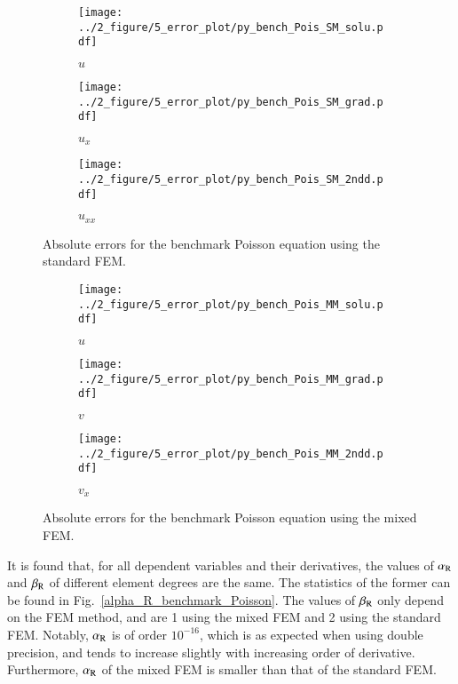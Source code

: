 \documentclass[review,3p]{elsarticle}
\begin{document}
\begin{figure}[!ht]
    \begin{subfigure}{5.5cm}
        \texttt{[image: ../2\_figure/5\_error\_plot/py\_bench\_Pois\_SM\_solu.pdf]}
        \caption{$u$}
        \label{py_bench_Pois_SM_solu}
    \end{subfigure}
    \hspace{-0.2cm}
    \begin{subfigure}{5.5cm}
        \texttt{[image: ../2\_figure/5\_error\_plot/py\_bench\_Pois\_SM\_grad.pdf]}
        \caption{$u_x$}
        \label{py_bench_Pois_SM_grad}
    \end{subfigure}
    \hspace{-0.2cm}
    \begin{subfigure}{5.5cm}
        \texttt{[image: ../2\_figure/5\_error\_plot/py\_bench\_Pois\_SM\_2ndd.pdf]}
        \caption{$u_{xx}$}
        \label{py_bench_Pois_SM_2ndd}
    \end{subfigure}
\caption{Absolute errors for the benchmark Poisson equation using the standard FEM.}
\label{py_bench_Pois_SM}
\end{figure}

\begin{figure}[!ht]
    \begin{subfigure}{5.5cm}
        \texttt{[image: ../2\_figure/5\_error\_plot/py\_bench\_Pois\_MM\_solu.pdf]}
        \caption{$u$}
        \label{py_bench_Pois_MM_solu}
    \end{subfigure}
    \hspace{-0.2cm}
    \begin{subfigure}{5.5cm}
        \texttt{[image: ../2\_figure/5\_error\_plot/py\_bench\_Pois\_MM\_grad.pdf]}
        \caption{$v$}
        \label{py_bench_Pois_MM_grad}
    \end{subfigure}
    \hspace{-0.2cm}
    \begin{subfigure}{5.5cm}
        \texttt{[image: ../2\_figure/5\_error\_plot/py\_bench\_Pois\_MM\_2ndd.pdf]}
        \caption{$v_x$}
        \label{py_bench_Pois_MM_2ndd}
    \end{subfigure}
\caption{Absolute errors for the benchmark Poisson equation using the mixed FEM.}
\label{py_bench_Pois_MM}
\end{figure}

It is found that, for all dependent variables and their derivatives, the values of $\alpha_{\rm R}$ and $\beta_{\rm R}$ of different element degrees are the same. The statistics of the former can be found in Fig.~\ref{alpha_R_benchmark_Poisson}. The values of $\beta_{\rm R}$ only depend on the FEM method, and are 1 using the mixed FEM and 2 using the standard FEM. Notably, $\alpha_{\rm R}$ is of order $10^{-16}$, which is as expected when using double precision, and tends to increase slightly with increasing order of derivative. Furthermore, $\alpha_{\rm R}$ of the mixed FEM is smaller than that of the standard FEM.  
\end{document}
